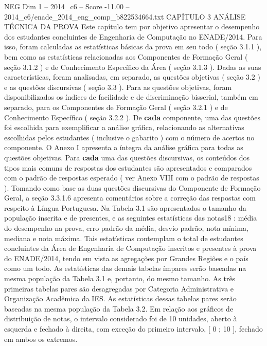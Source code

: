 \begin{textsample}{NEG Dim 1 – 2014\_c6 – Score -11.00 – 2014\_c6/enade\_2014\_eng\_comp\_b822534664.txt}  \label{ex:f1_neg_001}
CAPÍTULO 3 ANÁLISE TÉCNICA DA PROVA Este capítulo tem por objetivo apresentar o desempenho dos estudantes concluintes de Engenharia de Computação no ENADE/2014.
Para isso, foram calculadas as estatísticas básicas da prova em seu todo ( seção 3.1.1 ), bem como as estatísticas relacionadas aos Componentes de Formação Geral ( seção 3.1.2 ) e de Conhecimento Específico da Área ( seção 3.1.3 ).
Dadas as suas características, foram analisadas, em separado, as questões objetivas ( seção 3.2 ) e as questões discursivas ( seção 3.3 ).
Para as questões objetivas, foram disponibilizados os índices de facilidade e de discriminação bisserial, também em separado, para os Componentes de Formação Geral ( seção 3.2.1 ) e de Conhecimento Específico ( seção 3.2.2 ).
De \textbf{cada} componente, uma das questões foi escolhida para exemplificar a análise gráfica, relacionando as alternativas escolhidas pelos estudantes ( inclusive o gabarito ) com o número de acertos no componente.
O Anexo I apresenta a íntegra da análise gráfica para todas as questões objetivas.
Para \textbf{cada} uma das questões discursivas, os conteúdos dos tipos mais comuns de respostas dos estudantes são apresentados e comparados com o padrão de respostas esperado ( ver Anexo VIII com o padrão de respostas ).
Tomando como base as duas questões discursivas do Componente de Formação Geral, a seção 3.3.1.6 apresenta comentários sobre a correção das respostas com respeito à Língua Portuguesa.
Na Tabela 3.1 são apresentados o tamanho da população inscrita e de presentes, e as seguintes estatísticas das notas18 : média do desempenho na prova, erro padrão da média, desvio padrão, nota mínima, mediana e nota máxima.
Tais estatísticas contemplam o total de estudantes concluintes da Área de Engenharia de Computação inscritos e presentes à prova do ENADE/2014, tendo em vista as agregações por Grandes Regiões e o país como um todo.
As estatísticas das demais tabelas ímpares serão baseadas na mesma população da Tabela 3.1 e, portanto, do mesmo tamanho.
As três primeiras tabelas pares são desagregadas por Categoria Administrativa e Organização Acadêmica da IES.
As estatísticas dessas tabelas pares serão baseadas na mesma população da Tabela 3.2.
Em relação aos gráficos de distribuição de notas, o intervalo considerado foi de 10 unidades, aberto à esquerda e fechado à direita, com exceção do primeiro intervalo, [ 0 ; 10 ], fechado em ambos os extremos.

\end{textsample}
